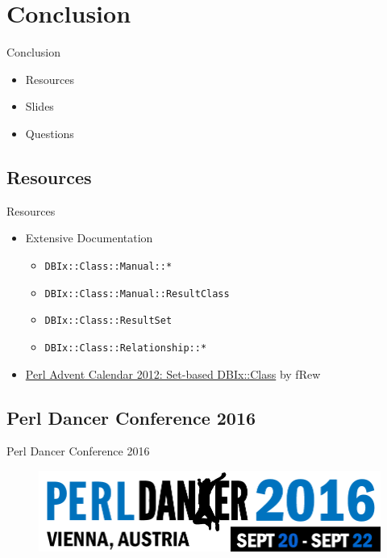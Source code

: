 \section{Conclusion}

\begin{frame}{Conclusion}
\begin{itemize}
\item Resources
\item Slides
\item Questions
\end{itemize}
\end{frame}

\subsection{Resources}
\begin{frame}[fragile]{Resources}
\begin{itemize}
\item Extensive Documentation
\begin{itemize}
\item \verb|DBIx::Class::Manual::*|
\item \verb|DBIx::Class::Manual::ResultClass|
\item \verb|DBIx::Class::ResultSet|
\item \verb|DBIx::Class::Relationship::*|
\end{itemize}
\item \href{http://www.perladvent.org/2012/2012-12-21.html}
{Perl Advent Calendar 2012: Set-based DBIx::Class}
by fRew
\end{itemize}
\end{frame}

\subsection{Perl Dancer Conference 2016}
\begin{frame}{Perl Dancer Conference 2016}
\begin{figure}[!ht]
\centering
\includegraphics[width=1\linewidth]{img/perl-dancer-homepage-logo-2016.png}
\end{figure}
\end{frame}

